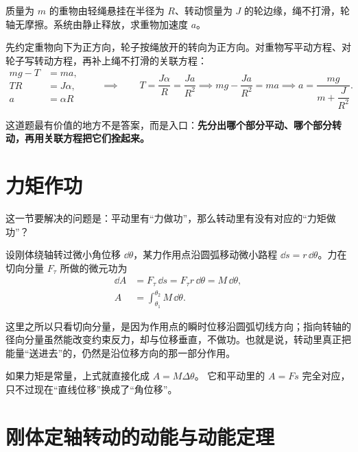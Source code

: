 \documentclass[lang=cn,11pt]{elegantbook}
\newcommand{\bridge}[1]{\begin{note}#1\end{note}}
\begin{document}
\begin{example}
质量为 \(m\) 的重物由轻绳悬挂在半径为 \(R\)、转动惯量为 \(J\) 的轮边缘，绳不打滑，轮轴无摩擦。系统由静止释放，求重物加速度 \(a\)。
\end{example}

\begin{solution}
先约定重物向下为正方向，轮子按绳放开的转向为正方向。对重物写平动方程、对轮子写转动方程，再补上绳不打滑的关联方程：
\[
\begin{aligned}
mg-T&=ma,\\
TR&=J\alpha,\\
a&=\alpha R
\end{aligned}
\qquad \implies \qquad
T=\frac{J\alpha}{R}=\frac{Ja}{R^2}
\implies
mg-\frac{Ja}{R^2}=ma
\implies
a=\frac{mg}{m+\dfrac{J}{R^2}}.
\]

这道题最有价值的地方不是答案，而是入口：\textbf{先分出哪个部分平动、哪个部分转动，再用关联方程把它们拴起来。}
\end{solution}

\section{力矩作功}

这一节要解决的问题是：平动里有“力做功”，那么转动里有没有对应的“力矩做功”？

设刚体绕轴转过微小角位移 \(\dd\theta\)，某力作用点沿圆弧移动微小路程 \(\dd s=r\,\dd\theta\)。力在切向分量 \(F_\tau\) 所做的微元功为
\begin{align*}
\dd A&=F_\tau\,\dd s=F_\tau r\,\dd\theta=M\,\dd\theta,\\
A&=\int_{\theta_1}^{\theta_2} M\,\dd\theta.
\end{align*}

\bridge{这里之所以只看切向分量，是因为作用点的瞬时位移沿圆弧切线方向；指向转轴的径向分量虽然能改变约束反力，却与位移垂直，不做功。也就是说，转动里真正把能量“送进去”的，仍然是沿位移方向的那一部分作用。}

\begin{remark}
如果力矩是常量，上式就直接化成 \(A=M\Delta\theta\)。
它和平动里的 \(A=Fs\) 完全对应，只不过现在“直线位移”换成了“角位移”。
\end{remark}

\section{刚体定轴转动的动能与动能定理}
\end{document}

